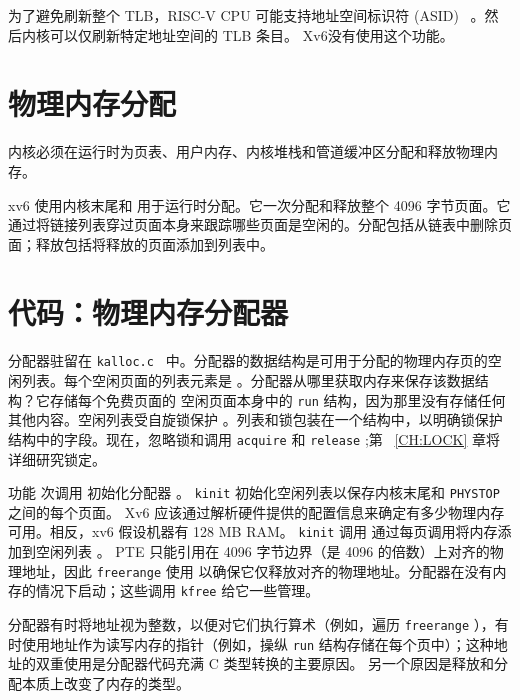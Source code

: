 为了避免刷新整个 TLB，RISC-V CPU 可能支持地址空间标识符 (ASID)~    \cite{riscv:priv}    。然后内核可以仅刷新特定地址空间的 TLB 条目。 Xv6没有使用这个功能。  

   \section{物理内存分配  }     

内核必须在运行时为页表、用户内存、内核堆栈和管道缓冲区分配和释放物理内存。  

xv6 使用内核末尾和
        用于运行时分配。它一次分配和释放整个 4096 字节页面。它通过将链接列表穿过页面本身来跟踪哪些页面是空闲的。分配包括从链表中删除页面；释放包括将释放的页面添加到列表中。
    \section{代码：物理内存分配器  }     

分配器驻留在  {    \tt    kalloc.c   }         中。分配器的数据结构是可用于分配的物理内存页的空闲列表。每个空闲页面的列表元素是
        。分配器从哪里获取内存来保存该数据结构？它存储每个免费页面的
 空闲页面本身中的    \lstinline{run}    结构，因为那里没有存储任何其他内容。空闲列表受自旋锁保护
        。列表和锁包装在一个结构中，以明确锁保护结构中的字段。现在，忽略锁和调用
    \lstinline{acquire}    和
    \lstinline{release}   ;第~    \ref{CH:LOCK}    章将详细研究锁定。  

功能
        次调用
        初始化分配器
        。
    \lstinline{kinit}    初始化空闲列表以保存内核末尾和  {    \tt    PHYSTOP   }  之间的每个页面。 Xv6 应该通过解析硬件提供的配置信息来确定有多少物理内存可用。相反，xv6 假设机器有 128 MB RAM。
    \lstinline{kinit}    调用
        通过每页调用将内存添加到空闲列表
        。 PTE 只能引用在 4096 字节边界（是 4096 的倍数）上对齐的物理地址，因此
    \lstinline{freerange}    使用
        以确保它仅释放对齐的物理地址。分配器在没有内存的情况下启动；这些调用
    \lstinline{kfree}    给它一些管理。  

分配器有时将地址视为整数，以便对它们执行算术（例如，遍历
    \lstinline{freerange}    ），有时使用地址作为读写内存的指针（例如，操纵
    \lstinline{run}    结构存储在每个页中）；这种地址的双重使用是分配器代码充满 C 类型转换的主要原因。
        另一个原因是释放和分配本质上改变了内存的类型。  

